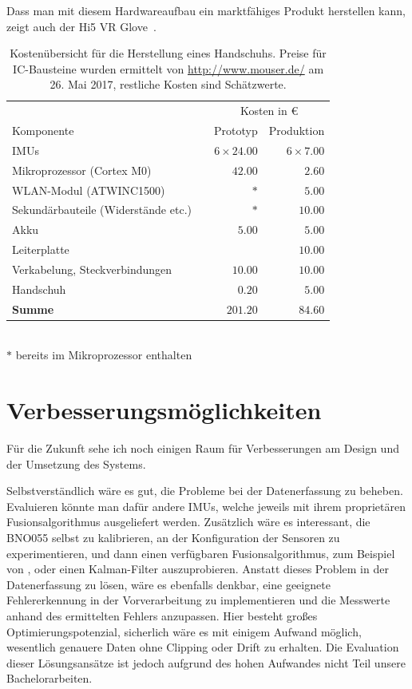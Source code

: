 Dass man mit diesem Hardwareaufbau ein marktfähiges Produkt herstellen kann,
zeigt auch der Hi5 VR Glove~\cite{web:hi5vrglove}.

\begin{table}
    \centering
    \renewcommand{\arraystretch}{1.2}
    \begin{tabular}{@{}llrr@{}}
        \toprule
        & \phantom{X} & \multicolumn{2}{c}{Kosten in \euro} \\
        \cmidrule{3-4}
        Komponente & & Prototyp & Produktion \\
        \midrule
        IMUs & & $6\times24.00$ & $6\times7.00$ \\
        Mikroprozessor (Cortex M0) & & $42.00$ & $2.60$ \\
        WLAN-Modul (ATWINC1500) & & $\ast$ & $5.00$ \\
        Sekundärbauteile (Widerstände etc.) & & $\ast$ & $10.00$ \\
        Akku & & $5.00$ & $5.00$ \\
        Leiterplatte & & \textendash{} & $10.00$ \\
        Verkabelung, Steckverbindungen & & $10.00$ & $10.00$ \\
        Handschuh & & $0.20$ & $5.00$ \\
        \midrule
        \textbf{Summe} & & $201.20$ & $84.60$ \\
        \bottomrule
    \end{tabular}
    \\[1.5ex]
    $\ast$ bereits im Mikroprozessor enthalten
    \caption[Kostenübersicht für die Herstellung eines
    Handschuhs]{Kostenübersicht für die Herstellung eines Handschuhs. Preise für
    IC-Bausteine wurden ermittelt von \url{http://www.mouser.de/} am 26. Mai
2017, restliche Kosten sind Schätzwerte.}
\end{table}

\section{Verbesserungsmöglichkeiten}

Für die Zukunft sehe ich noch einigen Raum für Verbesserungen am Design und der
Umsetzung des Systems.

Selbstverständlich wäre es gut, die Probleme bei der Datenerfassung zu beheben.
Evaluieren könnte man dafür andere IMUs, welche jeweils mit ihrem proprietären
Fusionsalgorithmus ausgeliefert werden. Zusätzlich wäre es interessant, die
BNO055 selbst zu kalibrieren, an der Konfiguration der Sensoren zu
experimentieren, und dann einen verfügbaren Fusionsalgorithmus, zum Beispiel
von \citet{madgwick}, oder einen Kalman-Filter auszuprobieren.  Anstatt dieses
Problem in der Datenerfassung zu lösen, wäre es ebenfalls denkbar, eine
geeignete Fehlererkennung in der Vorverarbeitung zu implementieren und die
Messwerte anhand des ermittelten Fehlers anzupassen.  Hier besteht großes
Optimierungspotenzial, sicherlich wäre es mit einigem Aufwand möglich,
wesentlich genauere Daten ohne Clipping oder Drift zu erhalten. Die Evaluation
dieser Lösungsansätze ist jedoch aufgrund des hohen Aufwandes nicht Teil unsere
Bachelorarbeiten.

